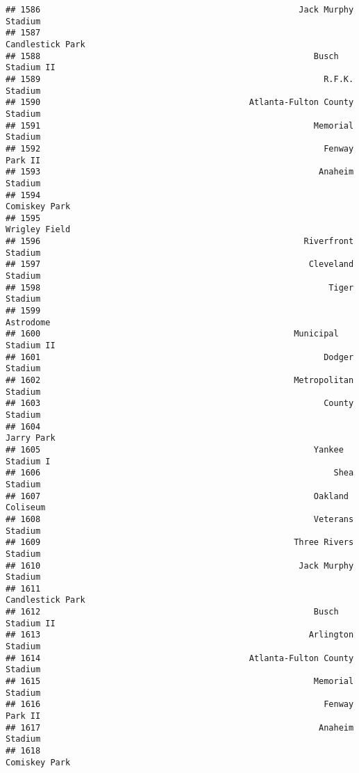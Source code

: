 \documentclass[]{article}
\begin{document}
\begin{verbatim}
## 1586                                                    Jack Murphy Stadium
## 1587                                                       Candlestick Park
## 1588                                                       Busch Stadium II
## 1589                                                         R.F.K. Stadium
## 1590                                          Atlanta-Fulton County Stadium
## 1591                                                       Memorial Stadium
## 1592                                                         Fenway Park II
## 1593                                                        Anaheim Stadium
## 1594                                                          Comiskey Park
## 1595                                                          Wrigley Field
## 1596                                                     Riverfront Stadium
## 1597                                                      Cleveland Stadium
## 1598                                                          Tiger Stadium
## 1599                                                              Astrodome
## 1600                                                   Municipal Stadium II
## 1601                                                         Dodger Stadium
## 1602                                                   Metropolitan Stadium
## 1603                                                         County Stadium
## 1604                                                             Jarry Park
## 1605                                                       Yankee Stadium I
## 1606                                                           Shea Stadium
## 1607                                                       Oakland Coliseum
## 1608                                                       Veterans Stadium
## 1609                                                   Three Rivers Stadium
## 1610                                                    Jack Murphy Stadium
## 1611                                                       Candlestick Park
## 1612                                                       Busch Stadium II
## 1613                                                      Arlington Stadium
## 1614                                          Atlanta-Fulton County Stadium
## 1615                                                       Memorial Stadium
## 1616                                                         Fenway Park II
## 1617                                                        Anaheim Stadium
## 1618                                                          Comiskey Park

\end{verbatim}
\end{document}

